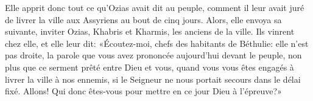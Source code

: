 Elle apprit donc tout ce qu’Ozias avait dit au peuple,
	comment il leur avait juré de livrer la ville aux Assyriens au bout de cinq jours.
Alors, elle envoya sa suivante,
	inviter Ozias, Khabris et Kharmis, les anciens de la ville.
Ils vinrent chez elle, et elle leur dit:
	«Écoutez-moi, chefs des habitants de Béthulie:
	elle n’est pas droite, la parole que vous avez prononcée aujourd’hui devant le peuple,
	non plus que ce serment prêté entre Dieu et vous,
	quand vous vous êtes engagés à livrer la ville à nos ennemis,
	si le Seigneur ne nous portait secours dans le délai fixé.
Allons! Qui donc êtes-vous pour mettre en ce jour Dieu à l’épreuve?»
